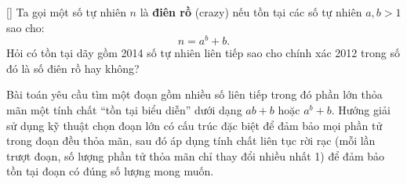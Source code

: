 \documentclass[../09-contruction-methods.tex]{subfiles}
\begin{document}

\newpage

\begin{example*}\label{example:SRB-2014-MO-P4}[\textbf{}]
    Ta gọi một số tự nhiên \( n \) là \textbf{điên rồ} (crazy) nếu tồn tại các số tự nhiên \( a, b > 1 \) sao cho:
    \[
        n = a^b + b.
    \]
    Hỏi có tồn tại dãy gồm 2014 số tự nhiên liên tiếp sao cho chính xác 2012 trong số đó là số điên rồ hay không?
\end{example*}

\begin{story*}
    Bài toán yêu cầu tìm một đoạn gồm nhiều số liên tiếp trong đó phần lớn thỏa mãn một tính chất “tồn tại biểu diễn” dưới dạng \( ab + b \) hoặc \( a^b + b \).
    Hướng giải sử dụng kỹ thuật chọn đoạn lớn có cấu trúc đặc biệt để đảm bảo mọi phần tử trong đoạn đều thỏa mãn,
    sau đó áp dụng tính chất liên tục rời rạc (mỗi lần trượt đoạn, số lượng phần tử thỏa mãn chỉ thay đổi nhiều nhất 1)
    để đảm bảo tồn tại đoạn có đúng số lượng mong muốn.
\end{story*}
\end{document}

